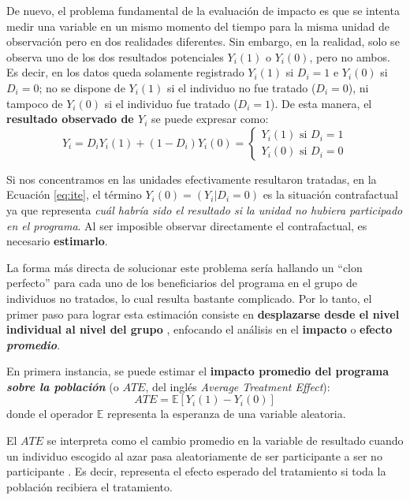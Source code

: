 \documentclass[../../main.tex]{subfiles}
\begin{document}
De nuevo, el problema fundamental de la evaluación de impacto es que se intenta medir una
variable en un mismo momento del tiempo para la misma unidad de observación pero en dos
realidades diferentes. Sin embargo, en la realidad, solo se observa uno de los dos resultados
potenciales \(Y_i(1)\) o \(Y_i(0)\), pero no ambos. Es decir, en los datos queda solamente
registrado \(Y_i(1)\) si \(D_i=1\) e \(Y_i(0)\) si \(D_i=0\); no se dispone de \(Y_i(1)\)
si el individuo no fue tratado (\(D_i=0\)), ni tampoco de \(Y_i(0)\) si el individuo fue
tratado (\(D_i=1\)). De esta manera, el \textbf{resultado observado de \(Y_i\)} se puede
expresar como:
\begin{equation}
    Y_i = D_i Y_i(1) + (1-D_i)Y_i(0) =
    \begin{cases}
        Y_i(1) \text{ si } D_i=1 \\
        Y_i(0) \text{ si } D_i=0
    \end{cases}
    \label{eq:observed-result}
\end{equation}

Si nos concentramos en las unidades efectivamente resultaron tratadas, en la Ecuación
\ref{eq:ite}, el término \(Y_i(0) = (Y_i|D_i=0)\) es la situación contrafactual ya que
representa \textit{cuál habría sido el resultado si la unidad no hubiera participado en el
programa}. Al ser imposible observar directamente el contrafactual, es necesario
\textbf{estimarlo}.

La forma más directa de solucionar este problema sería hallando un ``clon perfecto'' para
cada uno de los beneficiarios del programa en el grupo de individuos no tratados, lo cual
resulta bastante complicado. Por lo tanto, el primer paso para lograr esta estimación
consiste en \textbf{desplazarse desde el nivel individual al nivel del grupo}
\cite{gertler-2016}, enfocando el análisis en el \textbf{impacto} o \textbf{efecto
\textit{promedio}}.

En primera instancia, se puede estimar el \textbf{impacto promedio del programa
\textit{sobre la población}} (o \(ATE\), del inglés \textit{Average Treatment Effect}):
\begin{equation}
    ATE = \mathbb{E}\left[Y_i(1)-Y_i(0)\right]
\end{equation}
donde el operador \(\mathbb{E}\) representa la esperanza de una variable aleatoria.

El \(ATE\) se interpreta como el cambio promedio en la variable de resultado cuando un
individuo escogido al azar pasa aleatoriamente de ser participante a ser no participante
\cite{bernal}. Es decir, representa el efecto esperado del tratamiento si toda la
población recibiera el tratamiento.
\end{document}
